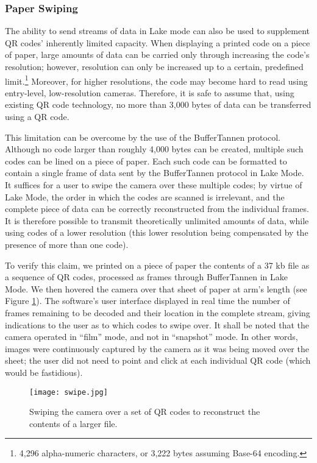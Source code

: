 \subsubsection{Paper Swiping}\label{subsub:swipe}

The ability to send streams of data in Lake mode can also be used to supplement QR codes' inherently limited capacity. When displaying a printed code on a piece of paper, large amounts of data can be carried only through increasing the code's resolution; however, resolution can only be increased up to a certain, predefined limit.\footnote{4,296 alpha-numeric characters, or 3,222 bytes assuming Base-64 encoding.} Moreover, for higher resolutions, the code may become hard to read using entry-level, low-resolution cameras. Therefore, it is safe to assume that, using existing QR code technology, no more than 3,000 bytes of data can be transferred using a QR code.

This limitation can be overcome by the use of the BufferTannen protocol. Although no code larger than roughly 4,000 bytes can be created, multiple such codes can be lined on a piece of paper. Each such code can be formatted to contain a single frame of data sent by the BufferTannen protocol in Lake Mode. It suffices for a user to swipe the camera over these multiple codes; by virtue of Lake Mode, the order in which the codes are scanned is irrelevant, and the complete piece of data can be correctly reconstructed from the individual frames. It is therefore possible to transmit theoretically unlimited amounts of data, while using codes of a lower resolution (this lower resolution being compensated by the presence of more than one code).

To verify this claim, we printed on a piece of paper the contents of a 37 kb file as a sequence of QR codes, processed as frames through BufferTannen in Lake Mode. We then hovered the camera over that sheet of paper at arm's length (see Figure \ref{fig:qr:paper-swipe}). The software's user interface displayed in real time the number of frames remaining to be decoded and their location in the complete stream, giving indications to the user as to which codes to swipe over. It shall be noted that the camera operated in ``film'' mode, and not in ``snapshot'' mode. In other words, images were continuously captured by the camera as it was being moved over the sheet; the user did not need to point and click at each individual QR code (which would be fastidious).

\begin{figure}
\centering
\texttt{[image: swipe.jpg]}
\caption{Swiping the camera over a set of QR codes to reconstruct the contents of a larger file.}
\label{fig:qr:paper-swipe}
\end{figure}

